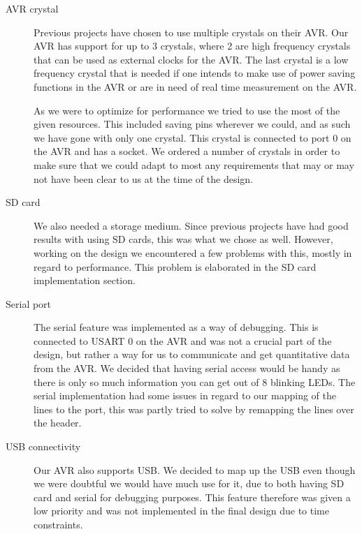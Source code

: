 \begin{description}

\item[AVR crystal] \hfill

Previous projects have chosen to use multiple crystals on their AVR. Our AVR has support for up to 3 crystals, where 2 are high frequency crystals that can be used as external clocks for the AVR. The last crystal is a low frequency crystal that is needed if one intends to make use of power saving functions in the AVR or are in need of real time measurement on the AVR. 

As we were to optimize for performance we tried to use the most of the given resources. This included saving pins wherever we could, and as such we have gone with only one crystal. This crystal is connected to port 0 on the AVR and has a socket. We ordered a number of crystals in order to make sure that we could adapt to most any requirements that may or may not have been clear to us at the time of the design.

\item[SD card]  \hfill %

We also needed a storage medium. Since previous projects have had good results with
using \ac{SD} cards, this was what we chose as well. However, working on the
design we encountered a few problems with this, mostly in
regard to performance. This problem is elaborated in the \ac{SD} card implementation
section. 

\item[Serial port]  \hfill

The serial feature was implemented as a way of debugging. This is connected to
\ac{USART} 0 on the AVR and was not a crucial part of the design, but rather a way for us to communicate and get quantitative data from the AVR. We decided that having serial access would be handy as there is only so much information you can get out of 8 blinking LEDs. The serial implementation had some issues in regard to our mapping of the lines to the port, this was partly tried to solve by remapping the lines over the header.

\item[USB connectivity]  \hfill 

Our AVR also supports \ac{USB}. We decided to map up the \ac{USB} even though we were doubtful we would have much use for it, due to both having \ac{SD} card and serial for debugging purposes. This feature therefore was given a low priority and was not implemented in the final design due to time constraints.
 

\end{description}
